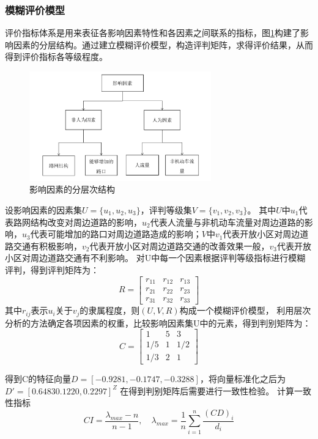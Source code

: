 \documentclass[fontset=fandol,a4paper,12pt]{ctexart}
\begin{document}
		\subsubsection{模糊评价模型}
			评价指标体系是用来表征各影响因素特性和各因素之间联系的指标，图\ref{fig:layer_struct}构建了影响因素的分层结构。通过建立模糊评价模型，构造评判矩阵，求得评价结果，从而得到评价指标各等级程度。
			\begin{figure}[!htbp]
				\centering
				\includegraphics[width=0.7\textwidth]{pic/judge_result.pdf}
				\caption{影响因素的分层次结构}
				\label{fig:layer_struct}
			\end{figure}
			设影响因素的因素集$ U=\{u_1,u_2,u_3\} $，评判等级集$ V=\{v_1,v_2,v_3\} $。
			其中$ U $中$ u_1 $代表路网结构改变对周边道路的影响，$ u_2 $代表人流量与非机动车流量对周边道路的影响，$ u_3 $代表可能增加的路口对周边道路造成的影响；$ V $中$ v_1 $代表开放小区对周边道路交通有积极影响，$ v_2 $代表开放小区对周边道路交通的改善效果一般，$ v_3 $代表开放小区对周边道路交通有不利影响。
			对U中每一个因素根据评判等级指标进行模糊评判，得到评判矩阵为：
			$$
				R=\left[
				\begin{array}{cccc}
					r_{11} & r_{12} & r_{13}\\
					r_{21} & r_{22} & r_{23}\\
					r_{31} & r_{32} & r_{33}
				\end{array}
				\right]
			$$
			其中$ r_{ij} $表示$ u_i $关于$ v_j $的隶属程度，则$ (U,V,R) $构成一个模糊评价模型，
			利用层次分析的方法确定各项因素的权重，比较影响因素集U中的元素，得到判别矩阵为：
			$$
				C=\left[
				\begin{array}{cccc}
					1 & 5 & 3\\
					1/5 & 1 & 1/2\\
					1/3 & 2 & 1
				\end{array}
				\right]
			$$
			
			得到C的特征向量$ D=[-0.9281,-0.1747,-0.3288] $，将向量标准化之后为$ D'=[0.6483 0.1220,0.2297]^Z $
			在得到判别矩阵后需要进行一致性检验。
			计算一致性指标
			$$CI=\frac{\lambda_{max}-n}{n-1},\quad\lambda_{max}=\frac{1}{n}\sum\limits_{i=1}^{n}\frac{(CD)_i}{d_i}$$
			
\end{document}
